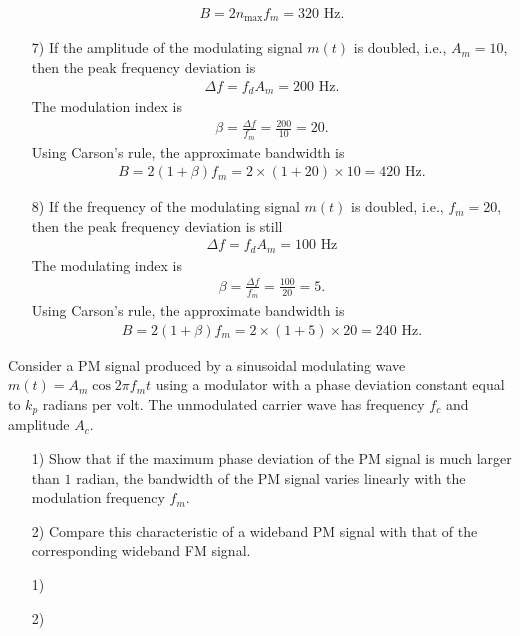 \documentclass{assignment}
\begin{document}
\begin{sol}
\begin{itemize}
        \begin{align}
            B=2n_{\max}f_m=320\text{ Hz}.
        \end{align}
        \item[7)] If the amplitude of the modulating signal $m(t)$ is doubled, i.e., $A_m=10$, then the peak frequency deviation is
        \begin{align}
            \Delta f=f_dA_m=200\text{ Hz}.
        \end{align}
        The modulation index is
        \begin{align}
            \beta=\frac{\Delta f}{f_m}=\frac{200}{10}=20.
        \end{align}
        Using Carson's rule, the approximate bandwidth is
        \begin{align}
            B=2(1+\beta)f_m=2\times(1+20)\times 10=420\text{ Hz}.
        \end{align}
        \item[8)] If the frequency of the modulating signal $m(t)$ is doubled, i.e., $f_m=20$, then the peak frequency deviation is still
        \begin{align}
            \Delta f=f_dA_m=100\text{ Hz}
        \end{align}
        The modulating index is
        \begin{align}
            \beta=\frac{\Delta f}{f_m}=\frac{100}{20}=5.
        \end{align}
        Using Carson's rule, the approximate bandwidth is
        \begin{align}
            B=2(1+\beta)f_m=2\times(1+5)\times 20=240\text{ Hz}.
        \end{align}
    \end{itemize}
\end{sol}

\begin{prob}
    Consider a PM signal produced by a sinusoidal modulating wave $m(t)=A_m\cos 2\pi f_mt$ using a modulator with a phase deviation constant equal to $k_p$ radians per volt. The unmodulated carrier wave has frequency $f_c$ and amplitude $A_c$.
    \begin{itemize}
        \item[1)] Show that if the maximum phase deviation of the PM signal is much larger than $1$ radian, the bandwidth of the PM signal varies linearly with the modulation frequency $f_m$.
        \item[2)] Compare this characteristic of a wideband PM signal with that of the corresponding wideband FM signal.
    \end{itemize}
\end{prob}
\begin{sol}
    \begin{itemize}
        \item[1)] 
        \item[2)] 
    \end{itemize}
\end{sol}
\end{document}
